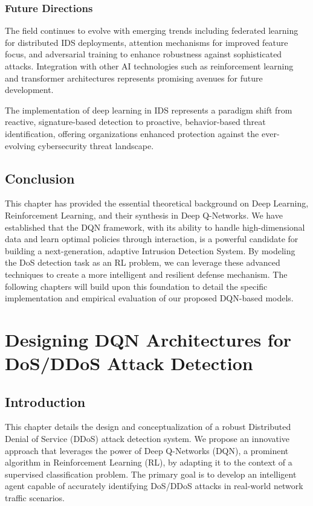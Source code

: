 \documentclass[12pt]{report}
\begin{document}
\subsection{Future Directions}
The field continues to evolve with emerging trends including federated learning for distributed IDS deployments, attention mechanisms for improved feature focus, and adversarial training to enhance robustness against sophisticated attacks. Integration with other AI technologies such as reinforcement learning and transformer architectures represents promising avenues for future development.

The implementation of deep learning in IDS represents a paradigm shift from reactive, signature-based detection to proactive, behavior-based threat identification, offering organizations enhanced protection against the ever-evolving cybersecurity threat landscape.

\section{Conclusion}
This chapter has provided the essential theoretical background on Deep Learning, Reinforcement Learning, and their synthesis in Deep Q-Networks. We have established that the DQN framework, with its ability to handle high-dimensional data and learn optimal policies through interaction, is a powerful candidate for building a next-generation, adaptive Intrusion Detection System. By modeling the DoS detection task as an RL problem, we can leverage these advanced techniques to create a more intelligent and resilient defense mechanism. The following chapters will build upon this foundation to detail the specific implementation and empirical evaluation of our proposed DQN-based models.

\chapter{Designing DQN Architectures for DoS/DDoS Attack Detection}
\section{Introduction}

This chapter details the design and conceptualization of a robust Distributed Denial of Service (DDoS) attack detection system. We propose an innovative approach that leverages the power of Deep Q-Networks (DQN), a prominent algorithm in Reinforcement Learning (RL), by adapting it to the context of a supervised classification problem. The primary goal is to develop an intelligent agent capable of accurately identifying DoS/DDoS attacks in real-world network traffic scenarios.
\end{document}
